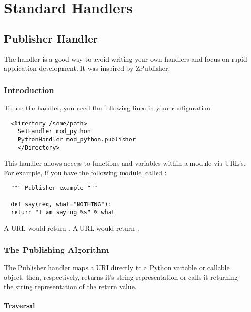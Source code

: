 \chapter{Standard Handlers\label{handlers}}

\section{Publisher Handler\label{hand-pub}}

The  handler is a good way to avoid writing your own
handlers and focus on rapid application development. It was inspired
by  ZPublisher.

\subsection{Introduction\label{hand-pub-intro}}

To use the handler, you need the following lines in your configuration
\begin{verbatim}
  <Directory /some/path>
    SetHandler mod_python 
    PythonHandler mod_python.publisher
    </Directory>
\end{verbatim}

This handler allows access to functions and variables within a module
via URL's. For example, if you have the following module, called 
:

\begin{verbatim}
  """ Publisher example """

  def say(req, what="NOTHING"):
  return "I am saying %s" % what

\end{verbatim}

A URL  would return 
. A URL 
 would
return .

\subsection{The Publishing Algorithm\label{hand-pub-alg}}

The Publisher handler maps a URI directly to a Python variable or
callable object, then, respectively, returns it's string
representation or calls it returning the string representation of the
return value.

\subsubsection{Traversal\label{hand-pub-alg-trav}}

